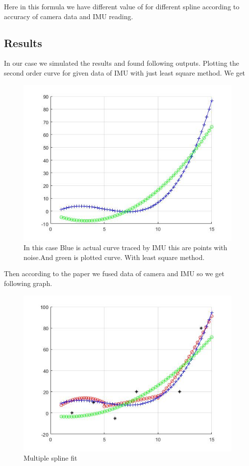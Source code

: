  Here in this formula we have different value of  for different spline according to accuracy of camera data and IMU reading.

\subsection{Results}
 
 In our case we simulated the results and found following outputs.
Plotting the second order curve for given data of IMU with just least square method. We get

\begin{figure}[!htb]
\includegraphics[width=\textwidth]{./figures/lsm.jpg}
\caption{In this case Blue is actual curve traced by IMU this are points with noise.And green is plotted curve. With least square method.}
\end{figure}

Then according to the paper we fused data of camera and IMU so we get following graph.

\begin{figure}[!htb]
\includegraphics[width=\textwidth]{./figures/AllOutput.jpg}
\caption{Multiple spline fit}
\label{fig:multipleSpline}
\end{figure}

